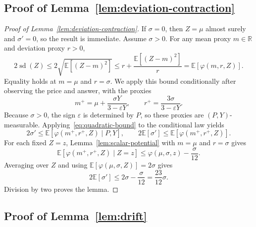 \documentclass[11pt]{article}
\newcommand{\E}[1]{\mathbb E\left[#1\right]}
\newcommand{\R}{\mathbb R}
\DeclareMathOperator{\sd}{sd}
\begin{document}
\subsection{Proof of Lemma~\ref{lem:deviation-contraction}}\label{app:contraction}

\deviationcontraction*

\begin{proof}[Proof of Lemma~\ref{lem:deviation-contraction}]
If $\sigma=0$, then $Z=\mu$ almost surely and $\sigma'=0$, so the result is immediate. Assume $\sigma>0$. For any mean proxy $m\in\R$ and deviation proxy $r>0$,
\begin{equation}\label{eq:quadratic-bound}
 2\sd(Z)\le2\sqrt{\E{(Z-m)^2}}
 \le r+\frac{\E{(Z-m)^2}}r
 =\E{\varphi(m,r,Z)}.
\end{equation}
Equality holds at $m=\mu$ and $r=\sigma$. We apply this bound conditionally after observing the price and answer, with the proxies
\[
 m^+=\mu+\frac{\sigma Y}{3-\varepsilon Y},
 \qquad r^+=\frac{3\sigma}{3-\varepsilon Y}.
\]
Because $\sigma>0$, the sign $\varepsilon$ is determined by $P$, so these proxies are $(P,Y)$-measurable. Applying~\eqref{eq:quadratic-bound} to the conditional law yields
\[
 2\sigma'\le\E{\varphi(m^+,r^+,Z)\mid P,Y},
 \qquad
 2\E{\sigma'}\le\E{\varphi(m^+,r^+,Z)}.
\]
For each fixed $Z=z$, Lemma~\ref{lem:scalar-potential} with $m=\mu$ and $r=\sigma$ gives
\[
 \E{\varphi(m^+,r^+,Z)\mid Z=z}
 \le\varphi(\mu,\sigma,z)-\frac\sigma{12}.
\]
Averaging over $Z$ and using $\E{\varphi(\mu,\sigma,Z)}=2\sigma$ gives
\[
 2\E{\sigma'}\le2\sigma-\frac\sigma{12}=\frac{23}{12}\sigma.
\]
Division by two proves the lemma.
\end{proof}

\subsection{Proof of Lemma~\ref{lem:drift}}\label{app:drift}

\potentialdecrease*
\end{document}
